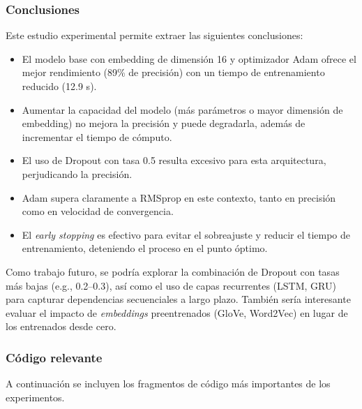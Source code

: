 \documentclass[12pt]{article}
\begin{document}
\subsubsection*{Conclusiones}

Este estudio experimental permite extraer las siguientes conclusiones:

\begin{itemize}
    \item El modelo base con embedding de dimensión 16 y optimizador Adam ofrece el mejor rendimiento (89\% de precisión) con un tiempo de entrenamiento reducido (12.9 s).
    \item Aumentar la capacidad del modelo (más parámetros o mayor dimensión de embedding) no mejora la precisión y puede degradarla, además de incrementar el tiempo de cómputo.
    \item El uso de Dropout con tasa 0.5 resulta excesivo para esta arquitectura, perjudicando la precisión.
    \item Adam supera claramente a RMSprop en este contexto, tanto en precisión como en velocidad de convergencia.
    \item El \textit{early stopping} es efectivo para evitar el sobreajuste y reducir el tiempo de entrenamiento, deteniendo el proceso en el punto óptimo.
\end{itemize}

Como trabajo futuro, se podría explorar la combinación de Dropout con tasas más bajas (e.g., 0.2--0.3), así como el uso de capas recurrentes (LSTM, GRU) para capturar dependencias secuenciales a largo plazo. También sería interesante evaluar el impacto de \textit{embeddings} preentrenados (GloVe, Word2Vec) en lugar de los entrenados desde cero.

\subsubsection*{Código relevante}

A continuación se incluyen los fragmentos de código más importantes de los experimentos.
\end{document}
